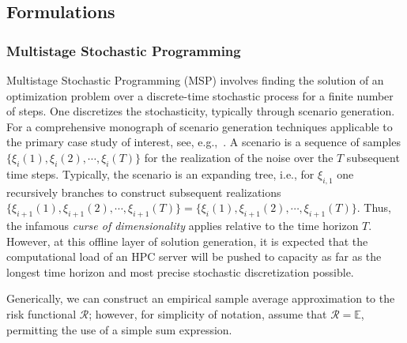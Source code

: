 \documentclass{article}
\newcommand{\1}{\mathds{1}}          %
\theoremstyle{definition}
\begin{document}
\begin{sloppypar}
\subsection{Formulations}
\subsubsection{Multistage Stochastic Programming}
Multistage Stochastic Programming (MSP) involves finding the solution of an optimization problem over a discrete-time stochastic process for a finite number of steps. One discretizes the stochasticity, typically through scenario generation. For a comprehensive monograph of scenario generation techniques applicable to the primary case study of interest, see, e.g.,~\cite{conejo2010decision}. A scenario is a sequence of samples $\{\xi_{i}(1),\xi_{i}(2),\cdots,\xi_{i}(T)\}$ for the realization of the noise over the $T$ subsequent time steps. Typically, the scenario is an expanding tree, i.e., for $\xi_{i,1}$ one recursively branches to construct subsequent realizations $\{\xi_{i+1}(1),\xi_{i+1}(2),\cdots,\xi_{i+1}(T)\}=\{\xi_{i}(1),\xi_{i+1}(2),\cdots,\xi_{i+1}(T)\}$. Thus, the infamous \emph{curse of dimensionality} applies relative to the time horizon $T$. However, at this offline layer of solution generation, it is expected that the computational load of an HPC server will be pushed to capacity as far as the longest time horizon and most precise stochastic discretization possible. 

Generically, we can construct an empirical sample average approximation to the risk functional $\mathcal{R}$; however, for simplicity of notation, assume that $\mathcal{R}=\mathbb{E}$, permitting the use of a simple sum expression. 


\end{sloppypar}
\end{document}
